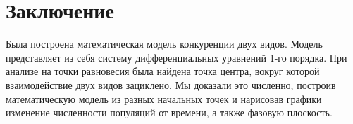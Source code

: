 \pagebreak

\section{Заключение}
	Была построена математическая модель конкуренции двух видов. Модель представляет из себя систему дифференциальных уравнений 1-го порядка. При анализе на точки равновесия была найдена точка центра, вокруг которой взаимодействие двух видов зациклено. Мы доказали это численно, построив математическую модель из разных начальных точек и нарисовав графики изменение численности популяций от времени, а также фазовую плоскость.

\pagebreak
